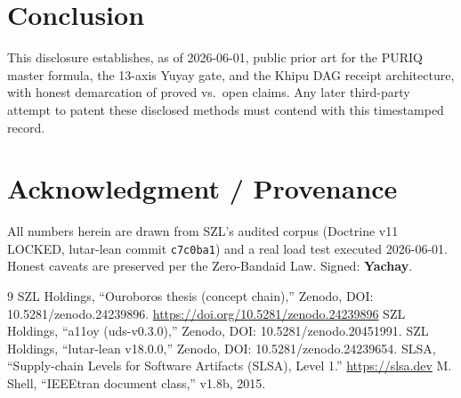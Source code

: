 \documentclass[10pt,conference]{IEEEtran}
\begin{document}
\section{Conclusion}
This disclosure establishes, as of 2026-06-01, public prior art for the PURIQ master
formula, the 13-axis Yuyay gate, and the Khipu DAG receipt architecture, with honest
demarcation of proved vs.\ open claims. Any later third-party attempt to patent these
disclosed methods must contend with this timestamped record.

\section*{Acknowledgment / Provenance}
All numbers herein are drawn from SZL's audited corpus (Doctrine v11 LOCKED, lutar-lean
commit \texttt{c7c0ba1}) and a real load test executed 2026-06-01. Honest caveats are
preserved per the Zero-Bandaid Law. Signed: \textbf{Yachay}.

\begin{thebibliography}{9}
 SZL Holdings, ``Ouroboros thesis (concept chain),'' Zenodo,
DOI: 10.5281/zenodo.24239896. \url{https://doi.org/10.5281/zenodo.24239896}
 SZL Holdings, ``a11oy (uds-v0.3.0),'' Zenodo,
DOI: 10.5281/zenodo.20451991.
 SZL Holdings, ``lutar-lean v18.0.0,'' Zenodo,
DOI: 10.5281/zenodo.24239654.
 SLSA, ``Supply-chain Levels for Software Artifacts (SLSA), Level 1.''
\url{https://slsa.dev}
 M. Shell, ``IEEEtran document class,'' v1.8b, 2015.
\end{thebibliography}
\end{document}
